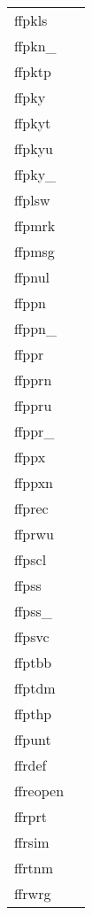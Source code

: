 \documentclass[11pt]{book}
\begin{document}
\begin{tabular}{lr}

ffpkls  & \pageref{ffpkls} \\
ffpkn\_     & \pageref{ffpknx} \\
ffpktp & \pageref{ffpktp} \\
ffpky          & \pageref{ffpky} \\
ffpkyt   & \pageref{ffpkyt} \\
ffpkyu     & \pageref{ffpkyu} \\
ffpky\_      & \pageref{ffpkyx} \\
ffplsw & \pageref{ffplsw} \\
ffpmrk   & \pageref{ffpmrk} \\
ffpmsg   & \pageref{ffpmsg} \\
ffpnul    & \pageref{ffpnul} \\
ffppn     & \pageref{ffppn} \\
ffppn\_ & \pageref{ffppnx} \\
ffppr        & \pageref{ffppr} \\
ffpprn & \pageref{ffpprn} \\
ffppru & \pageref{ffppru} \\
ffppr\_    & \pageref{ffpprx} \\
ffppx & \pageref{ffppx} \\
ffppxn & \pageref{ffppxn} \\
ffprec       & \pageref{ffprec} \\
ffprwu      & \pageref{ffpclu} \\
ffpscl     & \pageref{ffpscl} \\
ffpss    & \pageref{ffpss} \\
ffpss\_  & \pageref{ffpssx} \\
ffpsvc    & \pageref{ffpsvc} \\
ffptbb  & \pageref{ffptbb} \\
ffptdm         & \pageref{ffptdm} \\
ffpthp    & \pageref{ffpthp} \\
ffpunt     & \pageref{ffpunt} \\
ffrdef   & \pageref{ffrdef} \\
ffreopen      & \pageref{ffreopen} \\
ffrprt   & \pageref{ffrprt} \\
ffrsim     & \pageref{ffrsim} \\
ffrtnm & \pageref{ffrtnm} \\
ffrwrg    & \pageref{ffrwrg} \\

\end{tabular}
\end{document}
